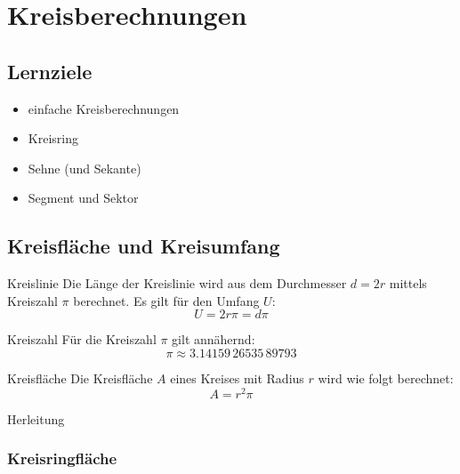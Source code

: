 
\section{Kreisberechnungen}


\subsection*{Lernziele}

\begin{itemize}
\item einfache Kreisberechnungen
\item Kreisring
\item Sehne (und Sekante)
\item Segment und Sektor
\end{itemize}

\newpage


\subsection{Kreisfläche und Kreisumfang}

\begin{definition}{Kreislinie}{}\index{$\pi$}
  Die Länge der Kreislinie wird aus dem Durchmesser $d=2r$  mittels Kreiszahl
  $\pi$ berechnet. Es gilt für den Umfang $U$:
  $$U = 2r\pi = d\pi$$
\end{definition}

\begin{gesetz}{Kreiszahl}{}
  Für die Kreiszahl $\pi$ gilt annähernd:
  $$\pi \approx 3.14159\,26535\,89793$$
  \end{gesetz}

\begin{gesetz}{Kreisfläche}{}
  Die Kreisfläche $A$ eines Kreises mit Radius $r$ wird wie folgt
  berechnet:
  $$A = r^2\pi$$
\end{gesetz}
Herleitung

\subsubsection{Kreisringfläche}

